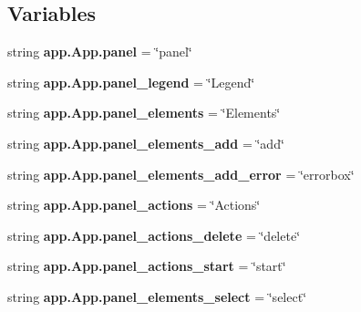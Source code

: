 \subsection*{Variables}
\begin{DoxyCompactItemize}
\item 
\mbox{\label{group___g_u_i_gaf0a2e70a31fc71f3c218757882011092}} 
string {\bfseries app.\+App.\+panel} = \char`\"{}panel\char`\"{}
\item 
\mbox{\label{group___g_u_i_gacfab4731f31b0c599bb4924321eab299}} 
string {\bfseries app.\+App.\+panel\+\_\+legend} = \char`\"{}Legend\char`\"{}
\item 
\mbox{\label{group___g_u_i_gad272b2c0b2e0c527c2f50a4df5dad86f}} 
string {\bfseries app.\+App.\+panel\+\_\+elements} = \char`\"{}Elements\char`\"{}
\item 
\mbox{\label{group___g_u_i_gae64b152de5853eb1c06532641556ed14}} 
string {\bfseries app.\+App.\+panel\+\_\+elements\+\_\+add} = \char`\"{}add\char`\"{}
\item 
\mbox{\label{group___g_u_i_gafa6932da315bf5d2420c40cce03d48c6}} 
string {\bfseries app.\+App.\+panel\+\_\+elements\+\_\+add\+\_\+error} = \char`\"{}errorbox\char`\"{}
\item 
\mbox{\label{group___g_u_i_ga02d8bb6a6b717a8fcec26c999fc674cd}} 
string {\bfseries app.\+App.\+panel\+\_\+actions} = \char`\"{}Actions\char`\"{}
\item 
\mbox{\label{group___g_u_i_ga10264027e14962e220eedfc1c0c0a0d5}} 
string {\bfseries app.\+App.\+panel\+\_\+actions\+\_\+delete} = \char`\"{}delete\char`\"{}
\item 
\mbox{\label{group___g_u_i_ga95b020ebcb48fde774fe73bcffa8a538}} 
string {\bfseries app.\+App.\+panel\+\_\+actions\+\_\+start} = \char`\"{}start\char`\"{}
\item 
\mbox{\label{group___g_u_i_gadc35495722a7f3f49db74a02653d28b0}} 
string {\bfseries app.\+App.\+panel\+\_\+elements\+\_\+select} = \char`\"{}select\char`\"{}
\item 

\end{DoxyCompactItemize}
